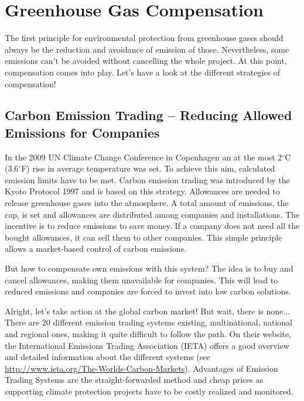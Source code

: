 
\chapter{Greenhouse Gas Compensation}\label{chap:compensation}

The first principle for environmental protection from greenhouse gases should always be the reduction and avoidance of emission of those.  Nevertheless, some emissions can't be avoided without cancelling the whole project. At this point, compensation comes into play. 
Let's have a look at the different strategies of compensation!

\section{Carbon Emission Trading -- Reducing Allowed Emissions for Companies} 

In the 2009 UN Climate Change Conference in Copenhagen an at the most 2$^\circ$C (3.6$^\circ$F) rise in average temperature was set. \cite{copenhagen} To achieve this aim, calculated emission limits have to be met. Carbon emission trading was introduced by the Kyoto Protocol 1997 and is based on this strategy. Allowances are needed to release greenhouse gases into the atmosphere. A total amount of emissions, the cap, is set and allowances are distributed among companies and installations. The incentive is to reduce emissions to save money. If a company does not need all the bought allowances, it can sell them to other companies. This simple principle allows a market-based control of carbon emissions.
\cite{bmub_Emission_Trading}


But how to compensate own emissions with this system? The idea is to buy and cancel allowances, making them unavailable for companies. This will lead to reduced emissions and companies are forced to invest into low carbon solutions. 
\cite{climakind}


Alright, let's take action at the global carbon market! But wait, there is none... There are 20 different emission trading systems existing, multinational, national and regional ones, making it quite difficult to follow the path. On their website, the International Emissions Trading Association (IETA) offers a good overview and detailed information about the different systems (see \url{http://www.ieta.org/The-Worlds-Carbon-Markets}).
Advantages of Emission Trading Systems are the straight-forwarded method and cheap prices as supporting climate protection projects have to be costly realized and monitored.


